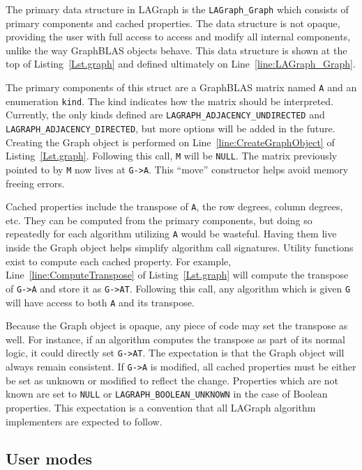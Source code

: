 The primary data structure in LAGraph is the \verb'LAGraph_Graph' which consists of primary components
and cached properties. The data structure is not opaque, providing the user with full access to access and
modify all internal components, unlike the way GraphBLAS objects behave.  This data structure is 
shown at the top of Listing~\ref{Lst.graph} and defined ultimately on Line~\ref{line:LAGraph_Graph}.

The primary components of this struct are a GraphBLAS matrix named \verb'A' and an enumeration \verb'kind'.
The kind indicates how the matrix should be interpreted.
Currently, the only kinds defined are \verb'LAGRAPH_ADJACENCY_UNDIRECTED' and 
\verb'LAGRAPH_ADJACENCY_DIRECTED', but more options will be added in the future.  Creating the 
Graph object is performed on Line~\ref{line:CreateGraphObject} of Listing~\ref{Lst.graph}.
Following this call, \verb'M' will be \verb'NULL'. The matrix previously pointed to by \verb'M' now
lives at \verb'G->A'. This ``move'' constructor helps avoid memory freeing errors.

Cached properties include the transpose of \verb'A', the row degrees, column degrees, etc.
They can be computed from the primary components, but doing so repeatedly for each algorithm
utilizing \verb'A' would be wasteful. Having them live inside the Graph object helps simplify
algorithm call signatures. Utility functions exist to compute each cached property.  For example,
Line~\ref{line:ComputeTranspose} of Listing~\ref{Lst.graph} will compute the transpose of \verb'G->A' and store it as \verb'G->AT'.
Following this call, any algorithm which is given \verb'G' will have access to both \verb'A' and its transpose.

Because the Graph object is opaque, any piece of code may set the transpose as well. For instance, if an algorithm
computes the transpose as part of its normal logic, it could directly set \verb'G->AT'.
The expectation is that the Graph object will always remain consistent.
If \verb'G->A' is modified, all cached properties must be either be set as unknown or modified to reflect the change.
Properties which are not known are set to \verb'NULL' or \verb'LAGRAPH_BOOLEAN_UNKNOWN' in the case of Boolean properties.
This expectation is a convention that all LAGraph algorithm implementers are expected to follow.



\subsection{User modes}

